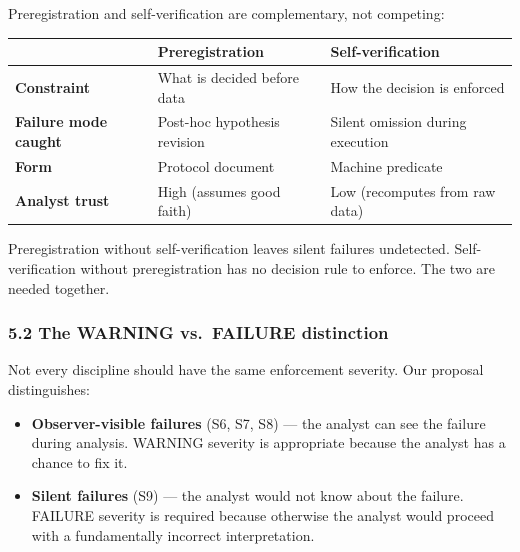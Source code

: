 \documentclass[
]{article}
\newcounter{none} %
\providecommand{\tightlist}{%
  \setlength{\itemsep}{0pt}\setlength{\parskip}{0pt}}
\begin{document}
Preregistration and self-verification are complementary, not competing:

{\def\LTcaptype{none} %
\begin{longtable}[]{@{}
  >{\raggedright\arraybackslash}p{}
  >{\raggedright\arraybackslash}p{}
  >{\raggedright\arraybackslash}p{}@{}}
\toprule\noalign{}
\begin{minipage}[b]{\linewidth}\raggedright
\end{minipage} & \begin{minipage}[b]{\linewidth}\raggedright
Preregistration
\end{minipage} & \begin{minipage}[b]{\linewidth}\raggedright
Self-verification
\end{minipage} \\
\midrule\noalign{}
\endhead
\bottomrule\noalign{}
\endlastfoot
\textbf{Constraint} & What is decided before data & How the decision is
enforced \\
\textbf{Failure mode caught} & Post-hoc hypothesis revision & Silent
omission during execution \\
\textbf{Form} & Protocol document & Machine predicate \\
\textbf{Analyst trust} & High (assumes good faith) & Low (recomputes
from raw data) \\
\end{longtable}
}

Preregistration without self-verification leaves silent failures
undetected. Self-verification without preregistration has no decision
rule to enforce. The two are needed together.

\subsubsection{5.2 The WARNING vs.~FAILURE
distinction}\label{the-warning-vs.-failure-distinction-1}

Not every discipline should have the same enforcement severity. Our
proposal distinguishes:

\begin{itemize}
\tightlist
\item
  \textbf{Observer-visible failures} (S6, S7, S8) --- the analyst can
  see the failure during analysis. WARNING severity is appropriate
  because the analyst has a chance to fix it.
\item
  \textbf{Silent failures} (S9) --- the analyst would not know about the
  failure. FAILURE severity is required because otherwise the analyst
  would proceed with a fundamentally incorrect interpretation.
\end{itemize}
\end{document}
